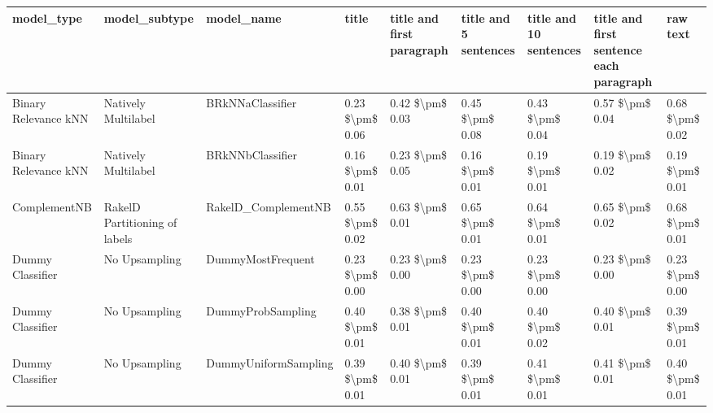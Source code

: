 \begin{tabular}{lllllllll}
\toprule
                     model\_type &                 model\_subtype &                                   model\_name &           title & title and first paragraph & title and 5 sentences & title and 10 sentences & title and first sentence each paragraph &        raw text \\
\midrule
           Binary Relevance kNN &           Natively Multilabel &                             BRkNNaClassifier & 0.23 \$\textbackslash pm\$ 0.06 &           0.42 \$\textbackslash pm\$ 0.03 &       0.45 \$\textbackslash pm\$ 0.08 &        0.43 \$\textbackslash pm\$ 0.04 &                         0.57 \$\textbackslash pm\$ 0.04 & 0.68 \$\textbackslash pm\$ 0.02 \\
           Binary Relevance kNN &           Natively Multilabel &                             BRkNNbClassifier & 0.16 \$\textbackslash pm\$ 0.01 &           0.23 \$\textbackslash pm\$ 0.05 &       0.16 \$\textbackslash pm\$ 0.01 &        0.19 \$\textbackslash pm\$ 0.01 &                         0.19 \$\textbackslash pm\$ 0.02 & 0.19 \$\textbackslash pm\$ 0.01 \\
                   ComplementNB & RakelD Partitioning of labels &                          RakelD\_ComplementNB & 0.55 \$\textbackslash pm\$ 0.02 &           0.63 \$\textbackslash pm\$ 0.01 &       0.65 \$\textbackslash pm\$ 0.01 &        0.64 \$\textbackslash pm\$ 0.01 &                         0.65 \$\textbackslash pm\$ 0.02 & 0.68 \$\textbackslash pm\$ 0.01 \\
               Dummy Classifier &                 No Upsampling &                            DummyMostFrequent & 0.23 \$\textbackslash pm\$ 0.00 &           0.23 \$\textbackslash pm\$ 0.00 &       0.23 \$\textbackslash pm\$ 0.00 &        0.23 \$\textbackslash pm\$ 0.00 &                         0.23 \$\textbackslash pm\$ 0.00 & 0.23 \$\textbackslash pm\$ 0.00 \\
               Dummy Classifier &                 No Upsampling &                            DummyProbSampling & 0.40 \$\textbackslash pm\$ 0.01 &           0.38 \$\textbackslash pm\$ 0.01 &       0.40 \$\textbackslash pm\$ 0.01 &        0.40 \$\textbackslash pm\$ 0.02 &                         0.40 \$\textbackslash pm\$ 0.01 & 0.39 \$\textbackslash pm\$ 0.01 \\
               Dummy Classifier &                 No Upsampling &                         DummyUniformSampling & 0.39 \$\textbackslash pm\$ 0.01 &           0.40 \$\textbackslash pm\$ 0.01 &       0.39 \$\textbackslash pm\$ 0.01 &        0.41 \$\textbackslash pm\$ 0.01 &                         0.41 \$\textbackslash pm\$ 0.01 & 0.40 \$\textbackslash pm\$ 0.01 \\

\end{tabular}
